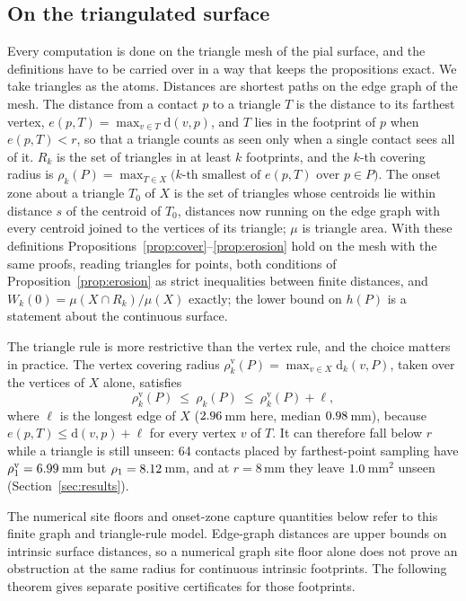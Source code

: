 \documentclass[11pt]{amsart}
\theoremstyle{definition}
\theoremstyle{remark}
\newcommand{\dd}{\mathrm{d}}
\begin{document}
\subsection*{On the triangulated surface}
Every computation is done on the triangle mesh of the pial surface, and the
definitions have to be carried over in a way that keeps the propositions
exact. We take triangles as the atoms. Distances are shortest paths on the
edge graph of the mesh. The distance from a contact $p$ to a triangle $T$ is
the distance to its farthest vertex, $e(p,T)=\max_{v\in T}\dd(v,p)$, and $T$
lies in the footprint of $p$ when $e(p,T)<r$, so that a triangle counts as seen
only when a single contact sees all of it. $R_k$ is the set of triangles in at
least $k$ footprints, and the $k$-th covering radius is
$\rho_k(P)=\max_{T\in X}\bigl(\text{$k$-th smallest of }e(p,T)\text{ over }p\in
P\bigr)$. The onset zone about a triangle $T_0$ of $X$ is the set of triangles
whose centroids lie within distance $s$ of the centroid of $T_0$, distances
now running on the edge graph with every centroid joined to the vertices of
its triangle; $\mu$ is triangle area. With these definitions
Propositions~\ref{prop:cover}--\ref{prop:erosion} hold on the mesh with the
same proofs, reading triangles for points, both conditions of
Proposition~\ref{prop:erosion} as strict inequalities between finite distances,
and $W_k(0)=\mu(X\cap R_k)/\mu(X)$ exactly; the lower bound on $h(P)$ is a
statement about the continuous surface.

The triangle rule is more restrictive than the vertex rule, and the choice matters in practice. The
vertex covering radius $\rho_k^{\mathrm{v}}(P)=\max_{v\in X}\dd_k(v,P)$, taken
over the vertices of $X$ alone, satisfies
\[
\rho_k^{\mathrm{v}}(P)\ \le\ \rho_k(P)\ \le\ \rho_k^{\mathrm{v}}(P)+\ell,
\]
where $\ell$ is the longest edge of $X$ ($2.96$\,mm here, median
$0.98$\,mm), because $e(p,T)\le\dd(v,p)+\ell$ for every vertex $v$ of
$T$. It can therefore fall below $r$ while a triangle is still unseen: 64
contacts placed by farthest-point sampling have $\rho_1^{\mathrm{v}}=
6.99$\,mm but $\rho_1=8.12$\,mm, and at
$r=8$\,mm they leave $1.0$\,mm$^2$ unseen
(Section~\ref{sec:results}).

The numerical site floors and onset-zone capture quantities below refer
to this finite graph and triangle-rule model. Edge-graph distances are
upper bounds on intrinsic surface distances, so a numerical graph site
floor alone does not prove an obstruction at the same radius for
continuous intrinsic footprints. The following theorem gives separate
positive certificates for those footprints.
\end{document}
